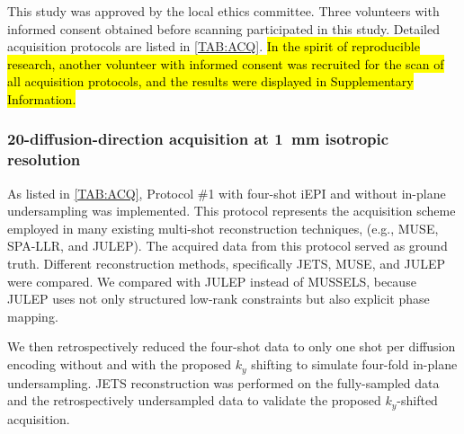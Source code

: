 \documentclass[preprint,12pt,authoryear,review]{elsarticle}
\begin{document}

    This study was approved by the local ethics committee.
    Three volunteers with informed consent obtained before scanning
    participated in this study.
    Detailed acquisition protocols are listed in \cref{TAB:ACQ}.
    \hl{In the spirit of reproducible research, another volunteer
    with informed consent was recruited
    for the scan of all acquisition protocols,
    and the results were displayed in Supplementary Information.}


	\subsubsection{20-diffusion-direction acquisition
    at \SI{1}{\milli\meter} isotropic resolution}

	As listed in \cref{TAB:ACQ}, Protocol \#1
	with four-shot iEPI and without in-plane undersampling
	was implemented. This protocol represents the acquisition scheme
	employed in many existing multi-shot reconstruction techniques,
	(e.g., MUSE, SPA-LLR, and JULEP).
	The acquired data from this protocol served as ground truth.
    Different reconstruction methods,
    specifically JETS, MUSE, and JULEP were compared.
    We compared with JULEP instead of MUSSELS,
    because JULEP uses not only structured low-rank constraints
    but also explicit phase mapping.

	We then retrospectively reduced the four-shot data to only one shot
	per diffusion encoding without and with the proposed $k_y$ shifting
    to simulate four-fold in-plane undersampling.
    JETS reconstruction was performed on the fully-sampled data
    and the retrospectively undersampled data
    to validate the proposed $k_y$-shifted acquisition.
\end{document}
